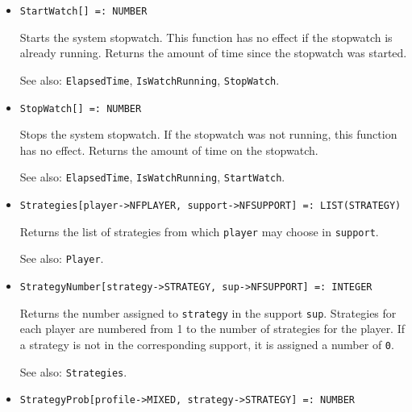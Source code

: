 \begin{itemize}
\item{}
\protect \large \begin{verbatim}
StartWatch[] =: NUMBER 
\end{verbatim}\normalsize

\bd
Starts the system stopwatch.  This function has no
effect if the stopwatch is already running.
Returns the amount of time since the stopwatch was started.
\item [See also:] \verb+ElapsedTime+, \verb+IsWatchRunning+, \verb+StopWatch+.
\ed

\item{}
\protect \large \begin{verbatim}
StopWatch[] =: NUMBER 
\end{verbatim}\normalsize

\bd
Stops the system stopwatch.  If the stopwatch was not
running, this function has no effect.  Returns the amount of time
on the stopwatch.
\item [See also:] \verb+ElapsedTime+, \verb+IsWatchRunning+,
\verb+StartWatch+.
\ed

\item{}
\protect \large \begin{verbatim}
Strategies[player->NFPLAYER, support->NFSUPPORT] =: LIST(STRATEGY) 
\end{verbatim}\normalsize

\bd
Returns the list of strategies from which  \verb+player+ may choose
in \verb+support+.
\item [See also:] \verb+Player+. 
\ed

\item{}
\protect \large \begin{verbatim}
StrategyNumber[strategy->STRATEGY, sup->NFSUPPORT] =: INTEGER
\end{verbatim}\normalsize

\bd 
Returns the number assigned to \verb+strategy+ in the support
\verb+sup+.  Strategies  for each player are numbered from 1 to
the number of strategies for the player.  If a strategy is not in
the corresponding support, it is assigned a number of
\verb+0+.
\item [See also:] \verb+Strategies+. 
\ed

\item{}
\protect \large \begin{verbatim}
StrategyProb[profile->MIXED, strategy->STRATEGY] =: NUMBER 
\end{verbatim} \normalsize


\end{itemize}
